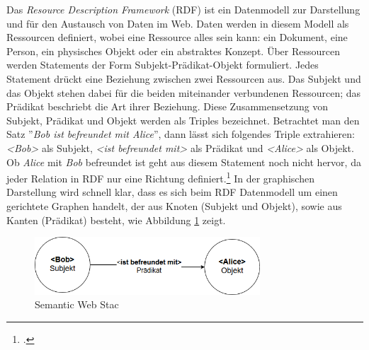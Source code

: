 \documentclass[12pt,a4paper]{article}
\begin{document}
Das \textit{Resource Description Framework} (RDF) ist ein Datenmodell zur Darstellung und für den Austausch von Daten im Web. Daten werden in diesem Modell als Ressourcen definiert, wobei eine Ressource alles sein kann: ein Dokument, eine Person, ein physisches Objekt oder ein abstraktes Konzept. Über Ressourcen werden Statements der Form Subjekt-Prädikat-Objekt formuliert. Jedes Statement drückt eine Beziehung zwischen zwei Ressourcen aus. Das Subjekt und das Objekt stehen dabei für die beiden miteinander verbundenen Ressourcen; das Prädikat beschriebt die Art ihrer Beziehung. Diese Zusammensetzung von Subjekt, Prädikat und Objekt werden als Triples bezeichnet. Betrachtet man den Satz ''\textit{Bob ist befreundet mit Alice}'', dann lässt sich folgendes Triple extrahieren: \textit{<Bob>} als Subjekt, \textit{<ist befreundet mit>} als Prädikat und \textit{<Alice>} als Objekt. Ob \textit{Alice} mit \textit{Bob} befreundet ist geht aus diesem Statement noch nicht hervor, da jeder Relation in RDF nur eine Richtung definiert.\footcite[Vgl.][S.16-21]{powers2003practical} In der graphischen Darstellung wird schnell klar, dass es sich beim RDF Datenmodell um einen gerichtete Graphen handelt, der aus Knoten (Subjekt und Objekt), sowie aus Kanten (Prädikat) besteht, wie Abbildung \ref{fig:triple} zeigt.
\begin{figure}[h]
  \centering
	\includegraphics[width=0.75\textwidth]{img/triple.png}  
    \caption[ Semantic Web Stac]{ Semantic Web Stac}
  	\label{fig:triple}
\end{figure}
\end{document}
